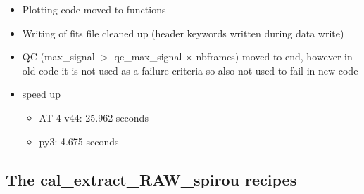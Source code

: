 \begin{itemize}
\item Plotting code moved to \spirouPlot functions

\item Writing of fits file cleaned up (header keywords written during data write)

\item QC (max\_signal $>$ qc\_max\_signal $\times$ nbframes) moved to end, however in old code it is not used as a failure criteria so also not used to fail in new code

\item speed up
	\begin{itemize}
	\item AT-4 v44: 25.962 seconds
	\item py3: 4.675 seconds
    \end{itemize}

\end{itemize}

\subsection{The cal\_extract\_RAW\_spirou recipes}
\label{ch:changelog:At4:cal_extract_RAW_spirou}

